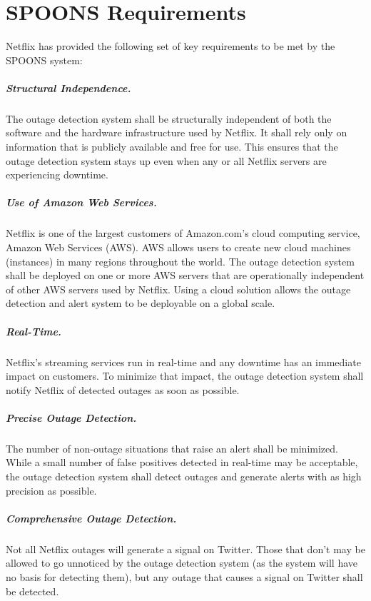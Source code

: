 \documentclass[12pt]{ucthesis}
\begin{document}
\chapter{SPOONS Requirements}
Netflix has provided the following set of key requirements to be met by the
SPOONS system:

\paragraph{Structural Independence.}
The outage detection system shall be structurally independent of both the
software and the hardware infrastructure used by Netflix. It shall rely only on
information that is publicly available and free for use. This ensures that the
outage detection system stays up even when any or all Netflix servers are
experiencing downtime.

\paragraph{Use of Amazon Web Services.}
Netflix is one of the largest customers of Amazon.com's cloud computing
service, Amazon Web Services (AWS). AWS allows users to create new cloud
machines (instances) in many regions throughout the world. The outage
detection system shall be deployed on one or more AWS servers that are
operationally independent of other AWS servers used by Netflix. Using a cloud
solution allows the outage detection and alert system to be deployable on a
global scale.

\paragraph{Real-Time.}
Netflix's streaming services run in real-time and any downtime has an immediate
impact on customers. To minimize that impact, the outage detection system shall notify
Netflix of detected outages as soon as possible.

\paragraph{Precise Outage Detection.}
The number of non-outage situations that raise an alert shall be minimized.
While a small number of false positives detected in real-time may be acceptable,
the outage detection system shall detect outages and generate alerts with as
high precision as possible.

\paragraph{Comprehensive Outage Detection.}
Not all Netflix outages will generate a signal on Twitter. Those that don't may
be allowed to go unnoticed by the outage detection system (as the system will
have no basis for detecting them), but any outage that causes a signal on
Twitter shall be detected.
\end{document}
